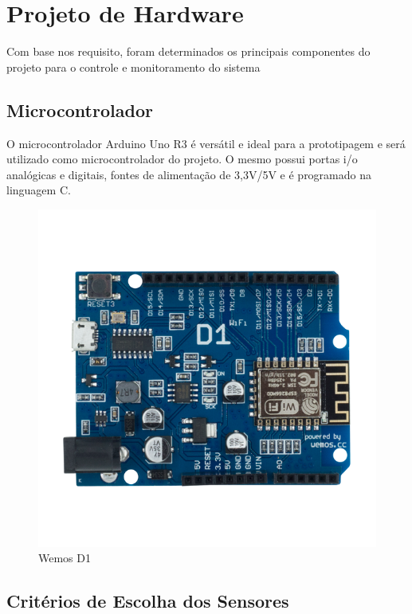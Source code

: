 \section{Projeto de Hardware}


Com base nos requisito, foram determinados os principais componentes do projeto
para o controle e monitoramento do sistema

\subsection{Microcontrolador}

O microcontrolador Arduino Uno R3 é versátil e ideal para a prototipagem e será
utilizado como microcontrolador do projeto. O mesmo possui portas i/o analógicas e
digitais, fontes de alimentação de 3,3V/5V e é programado na linguagem C.

\begin{figure}[h]
    \centering
    \includegraphics[scale=0.45]{figuras/projeto/hardware/wemos_d1.png}
    \caption{Wemos D1}
    \label{fig:wemos}
\end{figure}

\subsection{Critérios de Escolha dos Sensores}

